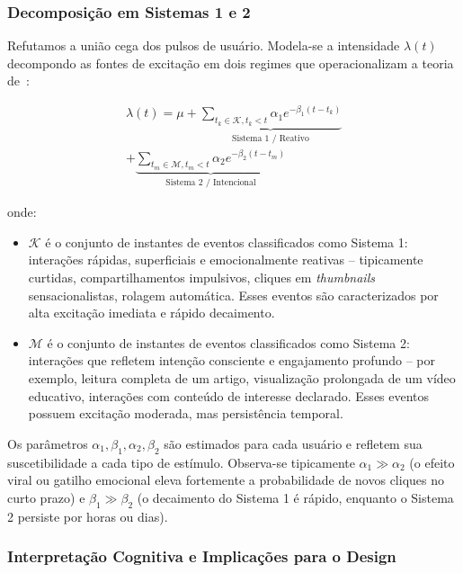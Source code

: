 \documentclass{sbc2023}
\begin{document}
\subsubsection{Decomposição em Sistemas 1 e 2} \label{sec:hawkes_decomp}

Refutamos a união cega dos pulsos de usuário. Modela-se a intensidade $\lambda(t)$ decompondo as fontes de excitação em dois regimes que operacionalizam a teoria de~\citet{kahneman2011}:

\begin{multline} \label{eq:hawkes}
    \lambda(t) = \mu + \underbrace{\sum_{t_k \in \mathcal{K}, t_k < t} \alpha_1 e^{-\beta_1(t-t_k)}}_{\text{Sistema 1 / Reativo}} \\
    + \underbrace{\sum_{t_m \in \mathcal{M}, t_m < t} \alpha_2 e^{-\beta_2(t-t_m)}}_{\text{Sistema 2 / Intencional}}
\end{multline}

onde:
\begin{itemize}
    \item $\mathcal{K}$ é o conjunto de instantes de eventos classificados como Sistema 1: interações rápidas, superficiais e emocionalmente reativas -- tipicamente curtidas, compartilhamentos impulsivos, cliques em \textit{thumbnails} sensacionalistas, rolagem automática. Esses eventos são caracterizados por alta excitação imediata e rápido decaimento.
    \item $\mathcal{M}$ é o conjunto de instantes de eventos classificados como Sistema 2: interações que refletem intenção consciente e engajamento profundo -- por exemplo, leitura completa de um artigo, visualização prolongada de um vídeo educativo, interações com conteúdo de interesse declarado. Esses eventos possuem excitação moderada, mas persistência temporal.
\end{itemize}

Os parâmetros $\alpha_1, \beta_1, \alpha_2, \beta_2$ são estimados para cada usuário e refletem sua suscetibilidade a cada tipo de estímulo. Observa-se tipicamente $\alpha_1 \gg \alpha_2$ (o efeito viral ou gatilho emocional eleva fortemente a probabilidade de novos cliques no curto prazo) e $\beta_1 \gg \beta_2$ (o decaimento do Sistema 1 é rápido, enquanto o Sistema 2 persiste por horas ou dias).

\subsubsection{Interpretação Cognitiva e Implicações para o Design} \label{sec:hawkes_interpretation}
\end{document}
